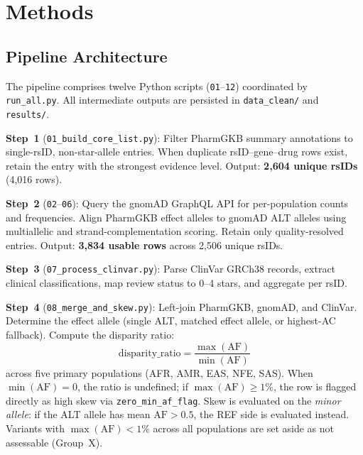 \documentclass[conference]{IEEEtran}
\begin{document}
\section{Methods}

\subsection{Pipeline Architecture}

The pipeline comprises twelve Python scripts (\texttt{01}--\texttt{12}) coordinated by \texttt{run\_all.py}.
All intermediate outputs are persisted in \texttt{data\_clean/} and \texttt{results/}.

\textbf{Step~1} (\texttt{01\_build\_core\_list.py}):
Filter PharmGKB summary annotations to single-rsID, non-star-allele entries. When duplicate rsID--gene--drug rows exist, retain the entry with the strongest evidence level. Output: \textbf{2,604 unique rsIDs} (4,016 rows).

\textbf{Step~2} (\texttt{02}--\texttt{06}):
Query the gnomAD GraphQL API for per-population counts and frequencies. Align PharmGKB effect alleles to gnomAD ALT alleles using multiallelic and strand-complementation scoring. Retain only quality-resolved entries. Output: \textbf{3,834 usable rows} across 2,506 unique rsIDs.

\textbf{Step~3} (\texttt{07\_process\_clinvar.py}):
Parse ClinVar GRCh38 records, extract clinical classifications, map review status to 0--4 stars, and aggregate per rsID.

\textbf{Step~4} (\texttt{08\_merge\_and\_skew.py}):
Left-join PharmGKB, gnomAD, and ClinVar. Determine the effect allele (single ALT, matched effect allele, or highest-AC fallback).
Compute the disparity ratio:
\begin{equation}
\text{disparity\_ratio} = \frac{\max(\text{AF})}{\min(\text{AF})}
\end{equation}
across five primary populations (AFR, AMR, EAS, NFE, SAS).
When $\min(\text{AF}) = 0$, the ratio is undefined; if $\max(\text{AF}) \ge 1\%$, the row is flagged directly as high skew via \texttt{zero\_min\_af\_flag}.
Skew is evaluated on the \emph{minor allele}: if the ALT allele has mean $\text{AF} > 0.5$, the REF side is evaluated instead.
Variants with $\max(\text{AF}) < 1\%$ across all populations are set aside as not assessable (Group~X).
\end{document}
